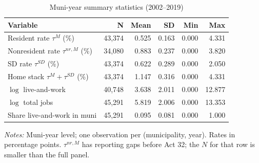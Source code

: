 \begin{table}[H]
  \centering
  \caption{Muni-year summary statistics (2002--2019)}
  \label{tab:summary_muni}
  \small
  \begin{tabular}{lrrrrr}
    \toprule
    Variable & N & Mean & SD & Min & Max \\
    \midrule
    Resident rate $\tau^{M}$ (\%) & 43,374 & 0.525 & 0.163 & 0.000 & 4.331 \\
    Nonresident rate $\tau^{nr,M}$ (\%) & 34,080 & 0.883 & 0.237 & 0.000 & 3.820 \\
    SD rate $\tau^{SD}$ (\%) & 43,374 & 0.622 & 0.289 & 0.000 & 2.050 \\
    Home stack $\tau^{M}+\tau^{SD}$ (\%) & 43,374 & 1.147 & 0.316 & 0.000 & 4.331 \\
    $\log$ live-and-work & 40,748 & 3.638 & 2.011 & 0.000 & 12.877 \\
    $\log$ total jobs & 45,291 & 5.819 & 2.006 & 0.000 & 13.353 \\
    Share live-and-work in muni & 45,291 & 0.095 & 0.081 & 0.000 & 1.000 \\
    \bottomrule
  \end{tabular}
  \vspace{0.3em}
  \begin{minipage}{0.95\textwidth}
    \footnotesize \textit{Notes:} Muni-year level; one observation per (municipality, year). Rates in percentage points. $\tau^{nr,M}$ has reporting gaps before Act 32; the $N$ for that row is smaller than the full panel.
  \end{minipage}
\end{table}
